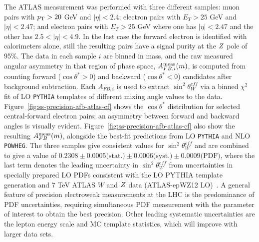The ATLAS measurement was performed with three different samples: muon
pairs with $p_{\mathrm{T}} > 20$ GeV and $|\eta| < 2.4$; electron pairs with $E_T
> 25$ GeV and $|\eta| < 2.47$; and electron pairs with $E_T > 25$ GeV
where one has $|\eta| < 2.47$ and the other has $2.5 < |\eta| < 4.9$.
In the last case the forward electron is identified with calorimeters
alone, still the resulting pairs have a signal purity at the
$Z$ pole of 95\%.  The data in each sample $i$ are binned in mass, and
the raw measured angular asymmetry in that region of phase space,
$A^{\rm meas}_{FB, i}(m)$, is computed from counting forward
($\cos\theta^* > 0$) and backward ($\cos\theta^* < 0$) candidates
after background subtraction.  Each $A_{FB,i}$ is used to extract
$\sin^2\theta^{eff}_{W}$ via a binned $\chi^2$ fit of
LO \texttt{PYTHIA} templates of different mixing angle values to the
data.  Figure~\ref{fig:ss-precision-afb-atlas-cf} shows the
$\cos\theta^*$ distribution for selected central-forward electron
pairs; an asymmetry between forward and backward angles is visually
evident.  Figure~\ref{fig:ss-precision-afb-atlas-cf} also show the
resulting $A^{\rm meas}_{FB}(m)$, alongside the best-fit predictions
from LO \texttt{PYTHIA} and NLO \texttt{POWHEG}.  The three samples
give consistent values for $\sin^2\theta^{eff}_{W}$ and are combined
to give a value of $0.2308 \pm 0.0005\textrm{(stat.)} \pm
0.0006\textrm{(syst.)} \pm 0.0009\textrm{(PDF)}$, where the last term
denotes the leading uncertainty in $\sin^2\theta^{eff}_{W}$ from
uncertainties in specially prepared LO PDFs consistent with the LO
PYTHIA template generation and 7 TeV ATLAS $W$ and $Z$ data
(ATLAS-epWZ12 LO)~\cite{Aad:2011dm}.  A general feature of precision
electroweak measurements at the LHC is the predominance of PDF
uncertainties, requiring simultaneous PDF measurement with the
parameter of interest to obtain the best precision.  Other leading
systematic uncertainties are the lepton energy scale and MC template
statistics, which will improve with larger data sets.

